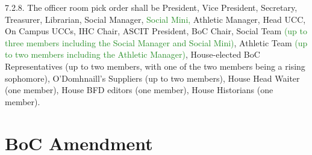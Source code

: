 \documentclass[10pt]{article} %
\begin{document}
\begin{itemize}
	7.2.8. The officer room pick order shall be President, Vice President, Secretary, Treasurer, Librarian, Social Manager, \textcolor{ForestGreen}{Social Mini,} Athletic Manager, Head UCC, On Campus UCCs, IHC Chair, ASCIT President, BoC Chair, Social Team \textcolor{ForestGreen}{(up to three members including the Social Manager and Social Mini)}, Athletic Team \textcolor{ForestGreen}{(up to two members including the Athletic Manager)}, House-elected BoC Representatives (up to two members, with one of the two members being a rising sophomore), O'Domhnaill's Suppliers (up to two members), House Head Waiter (one member), House BFD editors (one member), House Historians (one member).
\end{itemize}

\section{BoC Amendment}
\end{document}
